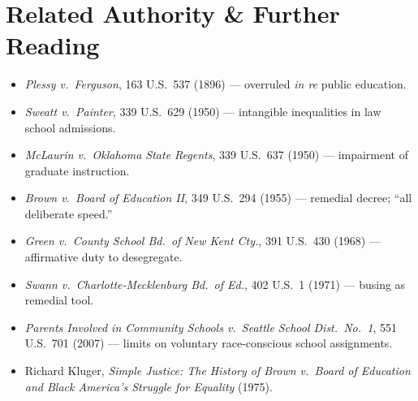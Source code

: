 \section{Related Authority \& Further Reading}

\begin{itemize}[leftmargin=1.2em, itemsep=1pt, topsep=2pt]
  \item \textit{Plessy v.\ Ferguson}, 163 U.S.\ 537 (1896) --- overruled \textit{in re} public education.
  \item \textit{Sweatt v.\ Painter}, 339 U.S.\ 629 (1950) --- intangible inequalities in law school admissions.
  \item \textit{McLaurin v.\ Oklahoma State Regents}, 339 U.S.\ 637 (1950) --- impairment of graduate instruction.
  \item \textit{Brown v.\ Board of Education II}, 349 U.S.\ 294 (1955) --- remedial decree; ``all deliberate speed.''
  \item \textit{Green v.\ County School Bd.\ of New Kent Cty.}, 391 U.S.\ 430 (1968) --- affirmative duty to desegregate.
  \item \textit{Swann v.\ Charlotte-Mecklenburg Bd.\ of Ed.}, 402 U.S.\ 1 (1971) --- busing as remedial tool.
  \item \textit{Parents Involved in Community Schools v.\ Seattle School Dist.\ No.\ 1}, 551 U.S.\ 701 (2007) --- limits on voluntary race-conscious school assignments.
  \item Richard Kluger, \textit{Simple Justice: The History of Brown v.\ Board of Education and Black America's Struggle for Equality} (1975).
\end{itemize}

